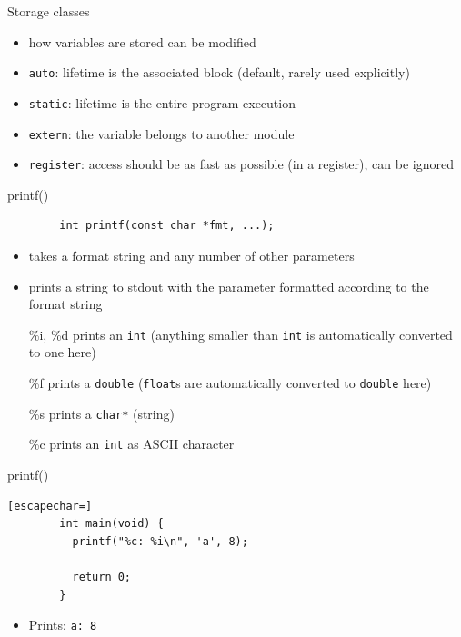 \documentclass[english,compress]{beamer}
\begin{document}
\begin{frame}{Storage classes}
	\begin{itemize}
		\item how variables are stored can be modified
		\item \lstinline|auto|: lifetime is the associated block (default, rarely used explicitly)
		\item \lstinline|static|: lifetime is the entire program execution
		\item \lstinline|extern|: the variable belongs to another module
		\item \lstinline|register|: access should be as fast as possible (in a register), can be ignored
	\end{itemize}
\end{frame}

\begin{frame}[fragile]{printf()}
	\begin{lstlisting}
		int printf(const char *fmt, ...);
	\end{lstlisting}
	\begin{itemize}
		\item takes a format string and any number of other parameters
		\item prints a string to stdout with the parameter formatted according to the format string
		\item[\%i, \%d] prints an \lstinline|int| (anything smaller than  \lstinline|int| is automatically converted to one here)
		\item[\%f] prints a \lstinline|double| (\lstinline|float|s are automatically converted to \lstinline|double| here)
		\item[\%s] prints a \lstinline|char*| (string)
		\item[\%c] prints an \lstinline|int| as ASCII character
	\end{itemize}
\end{frame}

\begin{frame}[fragile]{printf()}
	\begin{lstlisting}[escapechar=]
		int main(void) {
		  printf("%c: %i\n", 'a', 8);

		  return 0;
		}
	\end{lstlisting}
	\begin{itemize}
		\item Prints: \verb|a: 8|
	\end{itemize}
\end{frame}
\end{document}
